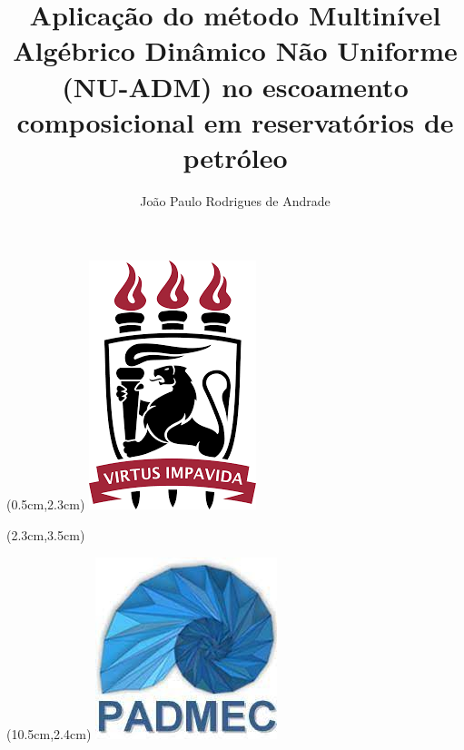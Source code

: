 \documentclass[professionalfont]{beamer}
\title[NU-ADM]{Aplicação do método Multinível Algébrico Dinâmico Não Uniforme (NU-ADM) no escoamento composicional em reservatórios de petróleo}
\author[João Paulo Rodrigues de Andrade]{João Paulo Rodrigues de Andrade}
\institute[UFPE]{Universidade Federal de Pernambuco}
\date{}
\begin{document}

\begin{frame}
    \begin{minipage}{\textwidth}
    
    \begin{textblock*}{5cm}(0.5cm,2.3cm) %
        \includegraphics[scale=0.2]{./imgs/ufpe.png}
    \end{textblock*}
    
    \begin{textblock*}{8cm}(2.3cm,3.5cm) %
        \Large \instituicao
    \end{textblock*}
    
    \begin{textblock*}{5cm}(10.5cm,2.4cm) %
        \includegraphics[scale=0.25]{./imgs/padmec.jpeg}
    \end{textblock*}
    \end{minipage}
    
    \vspace{1.8cm}
    

\end{frame}
\end{document}
